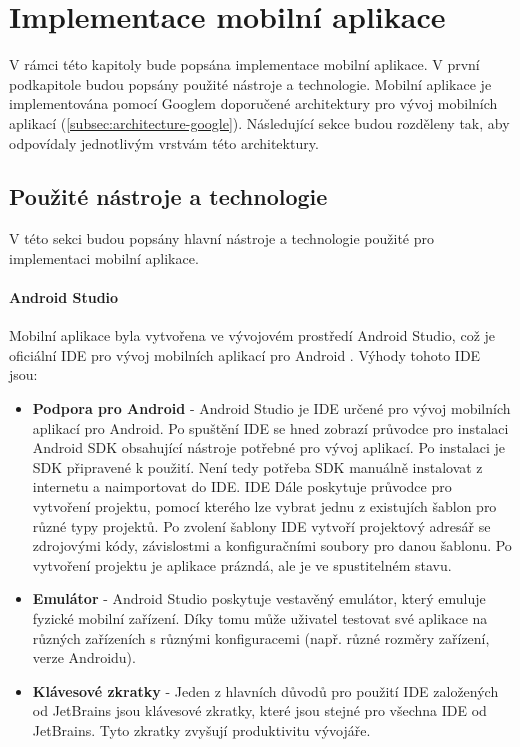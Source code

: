\chapter{Implementace mobilní aplikace}
\label{ch:implementation}

\begin{chapterabstract}
	V rámci této kapitoly bude popsána implementace mobilní aplikace. V první podkapitole budou popsány použité nástroje a technologie. Mobilní aplikace je implementována pomocí Googlem doporučené architektury pro vývoj mobilních aplikací (\ref{subsec:architecture-google}). Následující sekce budou rozděleny tak, aby odpovídaly jednotlivým vrstvám této architektury.
\end{chapterabstract}

\section{Použité nástroje a technologie}
V této sekci budou popsány hlavní nástroje a technologie použité pro implementaci mobilní aplikace.

\subsubsection *{Android Studio}
Mobilní aplikace byla vytvořena ve vývojovém prostředí Android Studio, což je oficiální IDE pro vývoj mobilních aplikací pro Android \cite{androidstudio}. Výhody tohoto IDE jsou:

\begin{itemize}
	\item \textbf{Podpora pro Android} - Android Studio je IDE určené pro vývoj mobilních aplikací pro Android. Po spuštění IDE se hned zobrazí průvodce pro instalaci Android SDK obsahující nástroje potřebné pro vývoj aplikací. Po instalaci je SDK připravené k použití. Není tedy potřeba SDK manuálně instalovat z internetu a naimportovat do IDE. IDE Dále poskytuje průvodce pro vytvoření projektu, pomocí kterého lze vybrat jednu z existujích šablon pro různé typy projektů. Po zvolení šablony IDE vytvoří projektový adresář se zdrojovými \linebreak kódy, závislostmi a konfiguračními soubory pro danou šablonu. Po vytvoření projektu je aplikace prázndá, ale je ve spustitelném stavu.
	
	\item \textbf{Emulátor} - Android Studio poskytuje vestavěný emulátor, který emuluje fyzické mobilní zařízení. Díky tomu může uživatel testovat své aplikace na různých zařízeních s různými konfiguracemi (např. různé rozměry zařízení, verze Androidu).
		
	\item \textbf{Klávesové zkratky} - Jeden z hlavních důvodů pro použití IDE založených od JetBrains jsou klávesové zkratky, které jsou stejné pro všechna IDE od JetBrains. Tyto zkratky zvyšují produktivitu vývojáře.
\end{itemize}

